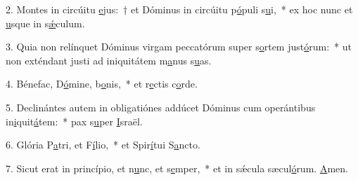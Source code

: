 2. Montes in circúitu \uline{e}jus:~† et Dóminus in circúitu p\uline{ó}puli s\uline{u}i,~* ex hoc nunc et \uline{u}sque in s\uline{ǽ}culum.\par 
3. Quia non relínquet Dóminus virgam peccatórum super s\uline{o}rtem just\uline{ó}rum:~* ut non exténdant justi ad iniquitátem m\uline{a}nus s\uline{u}as.\par 
4. Bénefac, D\uline{ó}mine, b\uline{o}nis,~* et r\uline{e}ctis c\uline{o}rde.\par 
5. Declinántes autem in obligatiónes addúcet Dóminus cum operántibus in\uline{i}quit\uline{á}tem:~* pax s\uline{u}per \uline{I}sraël.\par 
6. Glória P\uline{a}tri, et F\uline{í}lio,~* et Spir\uline{í}tui S\uline{a}ncto.\par 
7. Sicut erat in princípio, et n\uline{u}nc, et s\uline{e}mper,~* et in sǽcula sæcul\uline{ó}rum. \uline{A}men.\par 
